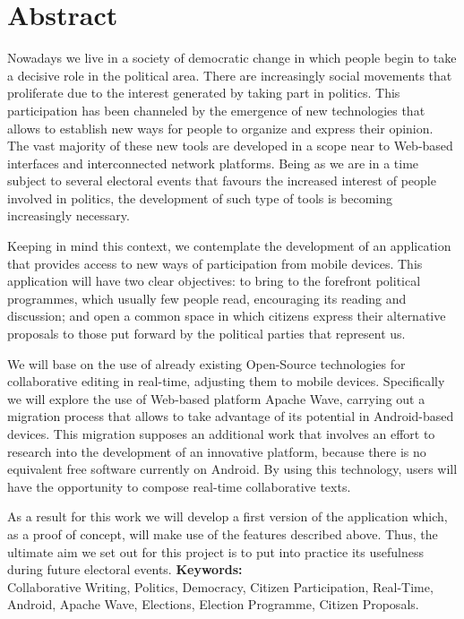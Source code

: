 \newpage
\renewcommand{\thepage}{\Roman{page}}
\setcounter{page}{9}
\chapter*{Abstract}
Nowadays we live in a society of democratic change in which people begin to take a decisive role  in the political area. There are increasingly social movements that proliferate due to the interest generated by taking part in politics. This participation has been channeled by the emergence of new technologies that allows to establish new ways for people to organize and express their opinion. The vast majority of these new tools are developed in a scope near to Web-based interfaces and interconnected network platforms. Being as we are in a time subject to several electoral events that favours the increased interest of people involved in politics, the development of such type of tools is becoming increasingly necessary.

Keeping in mind this context, we contemplate the development of an application that provides access to new ways of participation from mobile devices. This application will have two clear objectives: to bring to the forefront political programmes, which usually few people read, encouraging its reading and discussion; and open a common space in which citizens express their alternative proposals to those put forward by the political parties that represent us.
 
We will base on the use of already existing Open-Source technologies for collaborative editing in real-time, adjusting them to mobile devices. Specifically we will explore the use of Web-based platform Apache Wave, carrying out a migration process that allows to take advantage of its potential in Android-based devices. This migration supposes an additional work that involves an effort to research into the development of an innovative platform, because there is no equivalent free software currently on Android. By using this technology, users will have the opportunity to compose real-time collaborative texts.

As a result for this work we will develop a first version of the application which, as a proof of concept, will make use of the features described above. Thus, the ultimate aim we set out for this project is to put into practice its usefulness during future electoral events.
\vfill
{\large \bf Keywords:}\\
{\large Collaborative Writing, Politics, Democracy, Citizen Participation, Real-Time, Android, Apache Wave, Elections, Election Programme, Citizen Proposals. }

